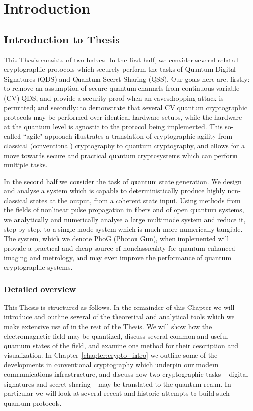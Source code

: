 \chapter{Introduction}


\section{Introduction to Thesis}

This Thesis consists of two halves. In the first half, we consider several related cryptographic protocols which securely perform the tasks of Quantum Digital Signatures (QDS) and Quantum Secret Sharing (QSS). Our goals here are, firstly: to remove an assumption of secure quantum channels from continuous-variable (CV) QDS, and provide a security proof when an eavesdropping attack is permitted; and secondly: to demonstrate that several CV quantum cryptographic protocols may be performed over identical hardware setups, while the hardware at the quantum level is agnostic to the protocol being implemented. This so-called ``agile" approach illustrates a translation of cryptographic agility from classical (conventional) cryptography to quantum cryptography, and allows for a move towards secure and practical quantum cryptosystems which can perform multiple tasks.

In the second half we consider the task of quantum state generation. We design and analyse a system which is capable to deterministically produce highly non-classical states at the output, from a coherent state input. Using methods from the fields of nonlinear pulse propagation in fibers and of open quantum systems, we analytically and numerically analyse a large multimode system and reduce it, step-by-step, to a single-mode system which is much more numerically tangible. The system, which we denote PhoG (\underline{Pho}ton \underline{G}un), when implemented will provide a practical and cheap source of nonclassicality for quantum enhanced imaging and metrology, and may even improve the performance of quantum cryptographic systems.



\subsection*{Detailed overview}

This Thesis is structured as follows. In the remainder of this Chapter we will introduce and outline several of the theoretical and analytical tools which we make extensive use of in the rest of the Thesis. We will show how the electromagnetic field may be quantized, discuss several common and useful quantum states of the field, and examine one method for their description and visualization. In Chapter~\ref{chapter:crypto_intro} we outline some of the developments in conventional cryptography which underpin our modern communications infrastructure, and discuss how two cryptographic tasks -- digital signatures and secret sharing -- may be translated to the quantum realm. In particular we will look at several recent and historic attempts to build such quantum protocols.

